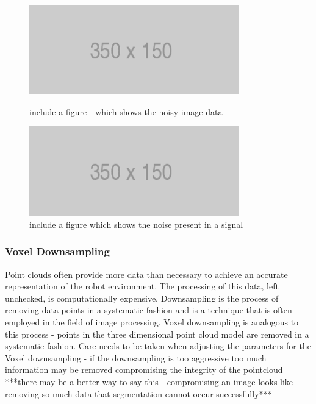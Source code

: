 \documentclass[a4paper]{article}
\begin{document}
\begin{figure}[h]
\begin{minipage}{0.45\linewidth}
\centering
\includegraphics[scale=0.5]{placeholder}
\caption{include a figure - which shows the noisy image data}
\end{minipage}
\hspace{0.5cm}
\begin{minipage}{0.45\linewidth}
\centering
\includegraphics[scale=0.5]{placeholder}
\caption{include a figure which shows the noise present in a signal }
\end{minipage}
\end{figure}

\subsubsection{Voxel Downsampling}
Point clouds often provide more data than necessary to achieve an accurate representation of the robot environment. The processing of this data, left unchecked, is computationally expensive. Downsampling is the process of removing data points in a systematic fashion and is a technique that is often employed in the field of image processing. Voxel downsampling is analogous to this process - points in the three dimensional point cloud model are removed in a systematic fashion. Care needs to be taken when adjusting the parameters for the Voxel downsampling - if the downsampling is too aggressive too much information may be removed compromising the integrity of the pointcloud ***there may be a better way to say this - compromising an image looks like removing so much data that segmentation cannot occur successfully***
\end{document}
